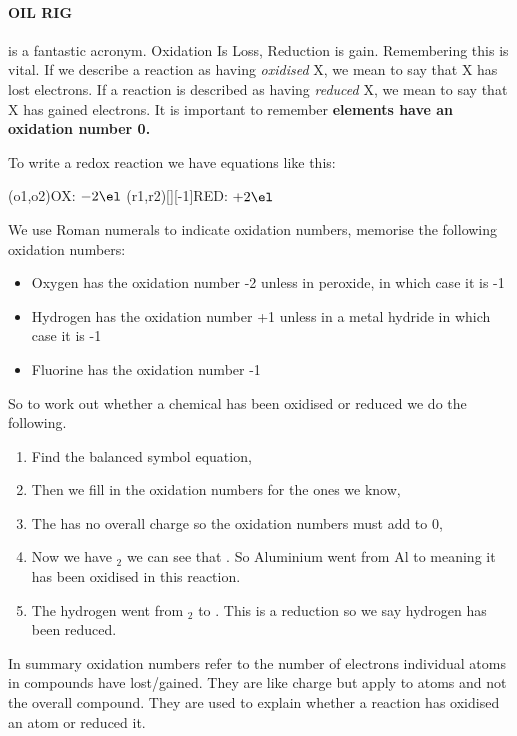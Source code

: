 	\paragraph{OIL RIG} is a fantastic acronym.
	Oxidation Is Loss, Reduction is gain.
	Remembering this is vital.
	If we describe a reaction as having \textit{oxidised} X, we mean to say that X has lost electrons.
	If a reaction is described as having \textit{reduced} X, we mean to say that X has gained electrons. It is important to remember \textbf{elements have an oxidation number 0.}
	
	To write a redox reaction we have equations like this:
	\begin{center}
	\vspace{7mm}
	\redox(o1,o2){\small OX: $- 2\el$}
	\redox(r1,r2)[][-1]{\small RED: $+ 2\el$}
	\vspace{7mm}
	\end{center}
	We use Roman numerals to indicate oxidation numbers, memorise the following oxidation numbers:
	\begin{itemize}
		\item Oxygen has the oxidation number -2 unless in peroxide, in which case it is -1
		\item Hydrogen has the oxidation number +1 unless in a metal hydride in which case it is -1
		\item Fluorine has the oxidation number -1
	\end{itemize}
	So to work out whether a chemical has been oxidised or reduced we do the following.
	
	\begin{enumerate}
		\item Find the balanced symbol equation,
		
		
		\item Then we fill in the oxidation numbers for the ones we know,
		
		 
		\item The  has no overall charge so the oxidation numbers must add to 0,
		
		
		\item Now we have $_2$ we can see that . So Aluminium went from Al to  meaning it has been oxidised in this reaction.
		
		\item The hydrogen went from $_2$ to . This is a reduction so we say hydrogen has been reduced.
	\end{enumerate}
    In summary oxidation numbers refer to the number of electrons individual atoms in compounds have lost/gained.
	They are like charge but apply to atoms and not the overall compound.
	They are used to explain whether a reaction has oxidised an atom or reduced it.
   \newpage
